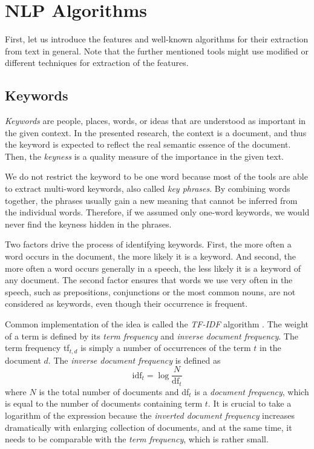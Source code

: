 \documentclass[
  digital, %
  notable,   %
  nolof,     %
  nolot,     %
]{fithesis3}
\begin{document}
\section{NLP Algorithms}
First, let us introduce the features and well-known algorithms for their extraction from text in general.
Note that the further mentioned tools might use modified or different techniques for extraction of the features.

\subsection{Keywords}
\label{algorithms_keywords}
\emph{Keywords} are people, places, words, or ideas that are understood as important in the given context. 
In the presented research, the context is a document, and thus the keyword is expected to reflect the real semantic essence of the document.
Then, the \textit{keyness} is a quality measure of the importance in the given text.
\cite[ch. 4]{scott2006textual}

We do not restrict the keyword to be one word because most of the tools are able to extract multi-word keywords, also called \textit{key phrases}.
By combining words together, the phrases usually gain a new meaning that cannot be inferred from the individual words.
Therefore, if we assumed only one-word keywords, we would never find the keyness hidden in the phrases.

Two factors drive the process of identifying keywords.
First, the more often a word occurs in the document, the more likely it is a keyword.
And second, the more often a word occurs generally in a speech, the less likely it is a keyword of any document.
\cite[ch. 4]{scott2006textual}
The second factor ensures that words we use very often in the speech, such as prepositions, conjunctions or the most common nouns, are not considered as keywords, even though their occurrence is frequent.

Common implementation of the idea is called the \textit{TF-IDF} algorithm \cite[ch. 6]{manning2008introduction}.
The weight of a term is defined by its \textit{term frequency} and \textit{inverse document frequency}.
The term frequency tf$_{t,d}$ is simply a number of occurrences of the term $t$ in the document $d$. The \textit{inverse document frequency} is defined as
$$
\text{idf}_t = \log{\frac{N}{\text{df}_t}}
$$
where $N$ is the total number of documents and df$_{t}$ is a \textit{document frequency}, which is equal to the number of documents containing term $t$.
It is crucial to take a logarithm of the expression because the \textit{inverted document frequency} increases dramatically with enlarging collection of documents, and at the same time, it needs to be comparable with the \textit{term frequency}, which is rather small.
\end{document}
